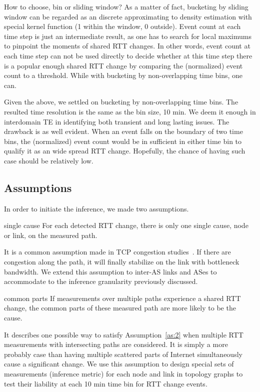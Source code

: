How to choose, bin or sliding window?
As a matter of fact, bucketing by sliding window can be regarded as an discrete approximating to density estimation with special kernel function (1 within the window, 0 outside). Event count at each time step is just an intermediate result, as one has to search for local maximums to pinpoint the moments of shared RTT changes.
In other words, event count at each time step can not be used directly to decide whether at this time step there is a popular enough shared RTT change by comparing the (normalized) event count to a threshold. While with bucketing by non-overlapping time bins, one can.

Given the above, we settled on bucketing by non-overlapping time bins. The resulted time resolution is the same as the bin size, 10 min. We deem it enough in interdomain TE in identifying both transient and long lasting issues. The drawback is as well evident. When an event falls on the boundary of two time bins, the (normalized) event count would be in sufficient in either time bin to qualify it as an wide spread RTT change. Hopefully, the chance of having such case should be relatively low.

\subsection{Assumptions}
In order to initiate the inference, we made two assumptions.

\begin{assumption}{1}{single cause}\label{as:2}
For each detected RTT change, there is only one single cause, node or link, on the measured path.
\end{assumption}
It is a common assumption made in TCP congestion studies~\cite{mathis1997macroscopic, Cardwell2016}. If there are congestion along the path, it will finally stabilize on the link with bottleneck bandwidth. 
We extend this assumption to inter-AS links and ASes to accommodate to the inference granularity previously discussed.

\begin{assumption}{2}{common parts}\label{as:1}
If measurements over multiple paths experience a shared RTT change, the common parts of these measured path are more likely to be the cause.
\end{assumption}
It describes one possible way to satisfy Assumption~\ref{as:2} when multiple RTT measurements with intersecting paths are considered.
It is simply a more probably case than having multiple scattered parts of Internet simultaneously cause a significant change. We use this assumption to design special sets of measurements (inference metric) for each node and link in topology graphs to test their liability at each 10 min time bin for RTT change events.

